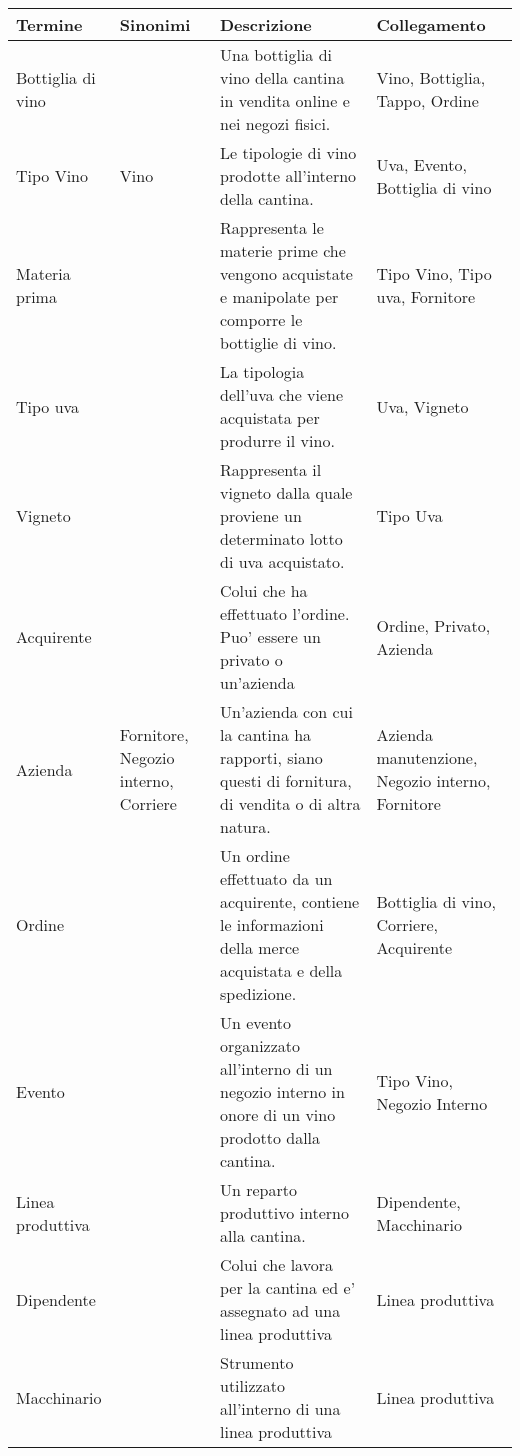 \begin{center}
	\begin{tabular}{P{2cm}P{2cm}P{6cm}P{4cm}}
		\toprule
		 Termine & Sinonimi & Descrizione & Collegamento \\
		
		\midrule
		Bottiglia di vino & & Una bottiglia di vino della cantina in vendita online e nei negozi fisici. & Vino, Bottiglia, Tappo, Ordine\\
		\midrule
		Tipo Vino & Vino & Le tipologie di vino prodotte all'interno della cantina. & Uva, Evento, Bottiglia di vino \\
		
		\midrule
		Materia prima & & Rappresenta le materie prime che vengono acquistate e manipolate per comporre le bottiglie di vino. &  Tipo Vino, Tipo uva, Fornitore\\
		
		\midrule
		Tipo uva &  & La tipologia dell'uva che viene acquistata per produrre il vino. &  Uva, Vigneto\\
		
		\midrule
		Vigneto & & Rappresenta il vigneto dalla quale proviene un determinato lotto di uva acquistato. &  Tipo Uva\\

		\midrule
		Acquirente & & Colui che ha effettuato l'ordine. Puo' essere un privato o un'azienda &  Ordine, Privato, Azienda\\

		\midrule
		Azienda & Fornitore, Negozio interno, Corriere & Un'azienda con cui la cantina ha rapporti, siano questi di fornitura, di vendita o di altra natura. &  Azienda manutenzione, Negozio interno, Fornitore\\

		\midrule
		Ordine & & Un ordine effettuato da un acquirente, contiene le informazioni della merce acquistata e della spedizione. &  Bottiglia di vino, Corriere, Acquirente\\

		\midrule
		Evento & & Un evento organizzato all'interno di un negozio interno in onore di un vino prodotto dalla cantina. &  Tipo Vino, Negozio Interno\\

		\midrule
		Linea produttiva & & Un reparto produttivo interno alla cantina. &  Dipendente, Macchinario\\

		\midrule
		Dipendente & & Colui che lavora per la cantina ed e' assegnato ad una linea produttiva &  Linea produttiva\\

		\midrule
		Macchinario & & Strumento utilizzato all'interno di una linea produttiva &  Linea produttiva\\
		
		\bottomrule
	\end{tabular}
\end{center}